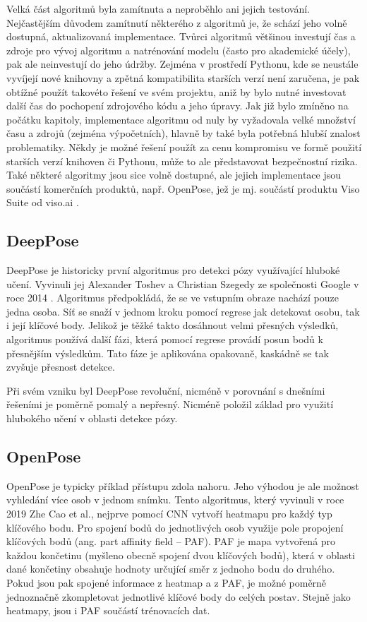 Velká část algoritmů byla zamítnuta a neproběhlo ani jejich testování.
Nejčastějším důvodem zamítnutí některého z algoritmů je, že schází jeho volně
dostupná, aktualizovaná implementace. Tvůrci algoritmů většinou investují čas a
zdroje pro vývoj algoritmu a natrénování modelu (často pro akademické účely),
pak ale neinvestují do jeho údržby. Zejména v prostředí Pythonu, kde se
neustále vyvíjejí nové knihovny a zpětná kompatibilita starších verzí není
zaručena, je pak obtížné použít takovéto řešení ve svém projektu, aniž by bylo
nutné investovat další čas do pochopení zdrojového kódu a jeho úpravy. Jak již
bylo zmíněno na počátku kapitoly, implementace algoritmu od nuly by vyžadovala
velké množství času a zdrojů (zejména výpočetních), hlavně by také byla
potřebná hlubší znalost problematiky. Někdy je možné řešení použít za cenu
kompromisu ve formě použití starších verzí knihoven či Pythonu, může to ale
představovat bezpečnostní rizika. Také některé algoritmy jsou sice volně
dostupné, ale jejich implementace jsou součástí komerčních produktů, např.
OpenPose, jež je mj. součástí produktu Viso Suite od viso.ai
\cite{visoai_openpose}.

\subsection{DeepPose}

DeepPose je historicky první algoritmus pro detekci pózy využívající hluboké
učení. Vyvinuli jej Alexander Toshev a Christian Szegedy ze společnosti Google
v roce 2014 \cite{deeppose}. Algoritmus předpokládá, že se ve vstupním obraze
nachází pouze jedna osoba. Síť se snaží v jednom kroku pomocí regrese jak
detekovat osobu, tak i její klíčové body. Jelikož je těžké takto dosáhnout
velmi přesných výsledků, algoritmus používá další fázi, která pomocí regrese
provádí posun bodů k přesnějším výsledkům. Tato fáze je aplikována opakovaně,
kaskádně se tak zvyšuje přesnost detekce.

Při svém vzniku byl DeepPose revoluční, nicméně v porovnání s dnešními řešeními
je poměrně pomalý a nepřesný. Nicméně položil základ pro využití hlubokého
učení v oblasti detekce pózy.

\subsection{OpenPose}

OpenPose \cite{openpose} je typicky příklad přístupu zdola nahoru. Jeho výhodou
je ale možnost vyhledání více osob v jednom snímku. Tento algoritmus, který
vyvinuli v roce 2019 Zhe Cao et al., nejprve pomocí CNN vytvoří heatmapu pro
každý typ klíčového bodu. Pro spojení bodů do jednotlivých osob využije pole
propojení klíčových bodů (ang. part affinity field – PAF). PAF je mapa
vytvořená pro každou končetinu (myšleno obecně spojení dvou klíčových bodů),
která v oblasti dané končetiny obsahuje hodnoty určující směr z jednoho bodu do
druhého. Pokud jsou pak spojené informace z heatmap a z PAF, je možné
poměrně jednoznačně zkompletovat jednotlivé klíčové body do celých postav.
Stejně jako heatmapy, jsou i PAF součástí trénovacích dat.

